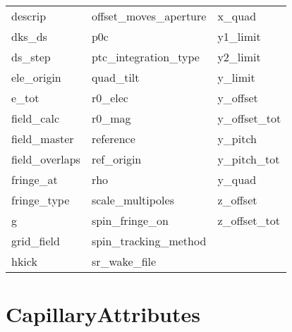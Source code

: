 \begin{tabular}{lll}
descrip                     & offset_moves_aperture       & x_quad                      \\
dks_ds                      & p0c                         & y1_limit                    \\
ds_step                     & ptc_integration_type        & y2_limit                    \\
ele_origin                  & quad_tilt                   & y_limit                     \\
e_tot                       & r0_elec                     & y_offset                    \\
field_calc                  & r0_mag                      & y_offset_tot                \\
field_master                & reference                   & y_pitch                     \\
field_overlaps              & ref_origin                  & y_pitch_tot                 \\
fringe_at                   & rho                         & y_quad                      \\
fringe_type                 & scale_multipoles            & z_offset                    \\
g                           & spin_fringe_on              & z_offset_tot                \\
grid_field                  & spin_tracking_method        &                             \\
hkick                       & sr_wake_file                &                             \\
 \bottomrule
 \end{tabular}
 \vfill
 
 \section{CapillaryAttributes}
 \label{s:list.capillary}
 
